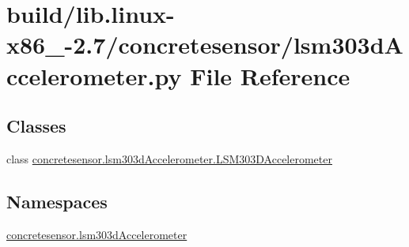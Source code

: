 \hypertarget{build_2lib_8linux-x86__64-2_87_2concretesensor_2lsm303dAccelerometer_8py}{}\section{build/lib.linux-\/x86\+\_-\/2.7/concretesensor/lsm303d\+Accelerometer.py File Reference}
\label{build_2lib_8linux-x86__64-2_87_2concretesensor_2lsm303dAccelerometer_8py}
\subsection*{Classes}
\begin{DoxyCompactItemize}
\item 
class \hyperlink{classconcretesensor_1_1lsm303dAccelerometer_1_1LSM303DAccelerometer}{concretesensor.\+lsm303d\+Accelerometer.\+L\+S\+M303\+D\+Accelerometer}
\end{DoxyCompactItemize}
\subsection*{Namespaces}
\begin{DoxyCompactItemize}
\item 
 \hyperlink{namespaceconcretesensor_1_1lsm303dAccelerometer}{concretesensor.\+lsm303d\+Accelerometer}
\end{DoxyCompactItemize}
